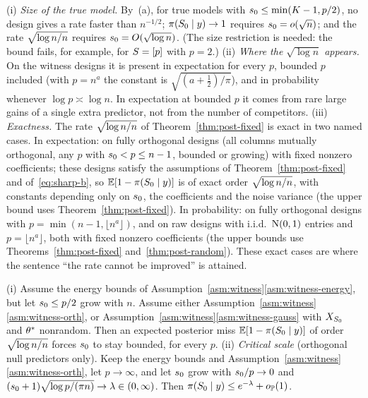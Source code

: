 \begin{remark}\label{rem:sharp}
(i) \emph{Size of the true model.} By~(a), for true models with $s_0\le\min(K-1,p/2)$, no design gives a rate faster than
$n^{-1/2}$; $\pi(S_0\mid y)\to1$ requires $s_0=o(\sqrt n)$; and the rate $\sqrt{\log n/n}$ requires $s_0=O(\sqrt{\log n})$. (The size restriction is
needed: the bound fails, for example, for $S=[p]$ with $p=2$.)
(ii) \emph{Where the $\sqrt{\log n}$ appears.} On the witness designs it is present in expectation for every $p$, bounded
$p$ included (with $p=n^a$ the constant is $\sqrt{(a+\frac12)/\pi}$), and in probability whenever $\log p\asymp\log n$. In
expectation at bounded $p$ it comes from rare large gains of a single extra predictor, not from the number of
competitors.
(iii) \emph{Exactness.} The rate $\sqrt{\log n/n}$ of Theorem~\ref{thm:post-fixed} is exact in two named cases. In expectation: on
fully orthogonal designs (all columns mutually orthogonal, any $p$ with $s_0<p\le n-1$, bounded or growing) with fixed
nonzero coefficients; these designs satisfy the assumptions of Theorem~\ref{thm:post-fixed} and of~\eqref{eq:sharp-b},
so $\operatorname{\mathbb{E}}[1-\pi(S_0\mid y)]$ is of exact order $\sqrt{\log n/n}$, with constants depending only on $s_0$, the coefficients and the noise
variance (the upper bound uses Theorem~\ref{thm:post-fixed}). In probability: on fully orthogonal designs with
$p=\min(n-1,\lfloor n^a\rfloor)$, and on raw designs with i.i.d.\ $\mathrm{N}(0,1)$ entries and $p=\lfloor n^a\rfloor$, both
with fixed nonzero coefficients (the upper bounds use Theorems~\ref{thm:post-fixed} and~\ref{thm:post-random}). These
exact cases are where the sentence ``the rate cannot be improved'' is attained.
\end{remark}

\begin{remark}\label{rem:sharp-growing}
(i) Assume the energy bounds of Assumption~\ref{asm:witness}\ref{asm:witness-energy}, but let $s_0\le p/2$ grow with $n$.
Assume either Assumption~\ref{asm:witness}\ref{asm:witness-orth}, or
Assumption~\ref{asm:witness}\ref{asm:witness-gauss} with $X_{S_0}$ and $\theta^*$ nonrandom. Then an expected posterior miss
$\operatorname{\mathbb{E}}[1-\pi(S_0\mid y)]$ of order $\sqrt{\log n/n}$ forces $s_0$ to stay bounded, for every $p$.
(ii) \emph{Critical scale} (orthogonal null predictors only). Keep the energy bounds and Assumption~\ref{asm:witness}\ref{asm:witness-orth},
let $p\to\infty$, and let $s_0$ grow with $s_0/p\to0$ and $(s_0+1)\sqrt{\log p/(\pi n)}\to\lambda\in(0,\infty)$. Then
$\pi(S_0\mid y)\le e^{-\lambda}+o_{\mathbb{P}}(1)$.
\end{remark}


